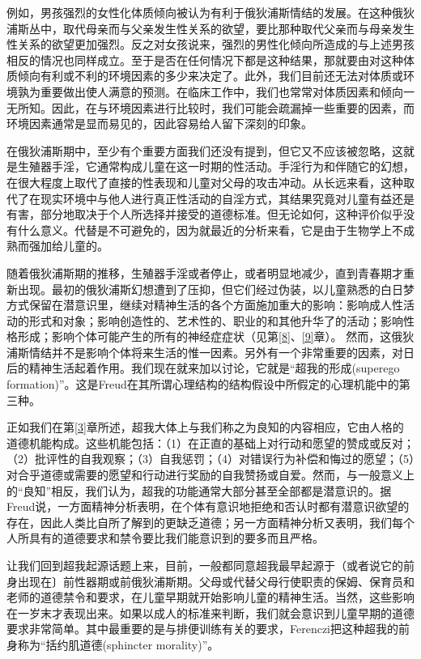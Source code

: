 \documentclass[UTF8,10pt,a4paper,openany]{book}
\begin{document}
例如，男孩强烈的女性化体质倾向被认为有利于俄狄浦斯情结的发展。在这种俄狄浦斯丛中，取代母亲而与父亲发生性关系的欲望，要比那种取代父亲而与母亲发生性关系的欲望更加强烈。反之对女孩说来，强烈的男性化倾向所造成的与上述男孩相反的情况也同样成立。至于是否在任何情况下都是这种结果，那就要由对这种体质倾向有利或不利的环境因素的多少来决定了。此外，我们目前还无法对体质或环境孰为重要做出使人满意的预测。在临床工作中，我们也常常对体质因素和倾向一无所知。因此，在与环境因素进行比较时，我们可能会疏漏掉一些重要的因素，而环境因素通常是显而易见的，因此容易给人留下深刻的印象。

在俄狄浦斯期中，至少有个重要方面我们还没有提到，但它又不应该被忽略，这就是生殖器手淫，它通常构成儿童在这一时期的性活动。手淫行为和伴随它的幻想，在很大程度上取代了直接的性表现和儿童对父母的攻击冲动。从长远来看，这种取代了在现实环境中与他人进行真正性活动的自淫方式，其结果究竟对儿童有益还是有害，部分地取决于个人所选择并接受的道德标准。但无论如何，这种评价似乎没有什么意义。代替是不可避免的，因为就最近的分析来看，它是由于生物学上不成熟而强加给儿童的。

随着俄狄浦斯期的推移，生殖器手淫或者停止，或者明显地减少，直到青春期才重新出现。最初的俄狄浦斯幻想遭到了压抑，但它们经过伪装，以儿童熟悉的白日梦方式保留在潜意识里，继续对精神生活的各个方面施加重大的影响：影响成人性活动的形式和对象；影响创造性的、艺术性的、职业的和其他升华了的活动；影响性格形成；影响个体可能产生的所有的神经症症状（见第\ref{8}、\ref{9}章）。
然而，这俄狄浦斯情结并不是影响个体将来生活的惟一因素。另外有一个非常重要的因素，对日后的精神生活起着作用。我们现在就来加以讨论，它就是“超我的形成(superego formation)”。这是Freud在其所谓心理结构的结构假设中所假定的心理机能中的第三种。

正如我们在第\ref{3}章所述，超我大体上与我们称之为良知的内容相应，它由人格的道德机能构成。这些机能包括：（1）在正直的基础上对行动和愿望的赞成或反对；（2）批评性的自我观察；（3）自我惩罚；（4）对错误行为补偿和悔过的愿望；（5）对合乎道德或需要的愿望和行动进行奖励的自我赞扬或自爱。然而，与一般意义上的“良知”相反，我们认为，超我的功能通常大部分甚至全部都是潜意识的。据Freud说，一方面精神分析表明，在个体有意识地拒绝和否认时都有潜意识欲望的存在，因此人类比自所了解到的更缺乏道德；另一方面精神分析又表明，我们每个人所具有的道德要求和禁令要比我们能意识到的要多而且严格。

让我们回到超我起源话题上来，目前，一般都同意超我最早起源于（或者说它的前身出现在〕前性器期或前俄狄浦斯期。父母或代替父母行使职责的保姆、保育员和老师的道德禁令和要求，在儿童早期就开始影响儿童的精神生活。当然，这些影响在一岁末才表现出来。如果以成人的标准来判断，我们就会意识到儿童早期的道德要求非常简单。其中最重要的是与排便训练有关的要求，Ferenczi把这种超我的前身称为“括约肌道德(sphincter morality)”。
\end{document}
